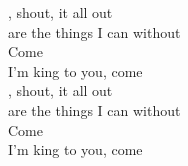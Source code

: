 , shout,  it all out \\
 are the things I can  without \\
Come  \\
I'm king to you, come  \songwordfb{} \\


, shout,  it all out \\
 are the things I can  without \\
Come  \\
I'm king to you, come  \songwordfb{} \\
